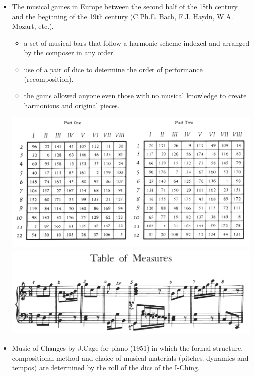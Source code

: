 \begin{itemize}
\item The musical games in Europe between the second half of the 18th century and the beginning of the 19th century (C.Ph.E. Bach, F.J. Haydn, W.A. Mozart, etc.).

  \begin{itemize}
  \tightlist
  \item a set of musical bars that follow a harmonic scheme indexed and arranged by the composer in any order.
  \item use of a pair of dice to determine the order of performance (recomposition).
  \item the game allowed anyone even those with no musical knowledge to create harmonious and original pieces.
  \end{itemize}
  
  \begin{center}
  \includegraphics[scale=0.4]{../img/mozart_tables.png}
  \includegraphics[scale=0.4]{../img/mozart_tables_1.png}
  \end{center}
  
\item Music of Changes by J.Cage for piano (1951) in which the formal structure, compositional method and choice of musical materials (pitches, dynamics and tempos) are determined by the roll of the dice of the I-Ching.


\end{itemize}
